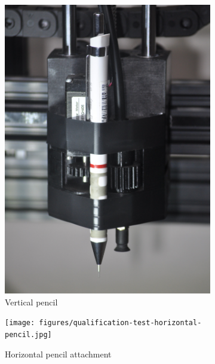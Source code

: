 \begin{figure}[!ht]
	\centering
	\begin{subfigure}{.25\textwidth}
		\centering
		\includegraphics[width=0.95\linewidth]{figures/qualification-test-vertical-pencil.jpg}
		\caption{Vertical pencil}
		\label{fig:qtp4-vertical-pencil}
	\end{subfigure}%
	\begin{subfigure}{.53\textwidth}
		\centering
		\texttt{[image: figures/qualification-test-horizontal-pencil.jpg]}
		\caption{Horizontal pencil attachment}
		\label{fig:qtp4-horizontal-pencil}
	\end{subfigure}
	\begin{subfigure}{.21\textwidth}
		\centering

\end{subfigure}
\end{figure}
